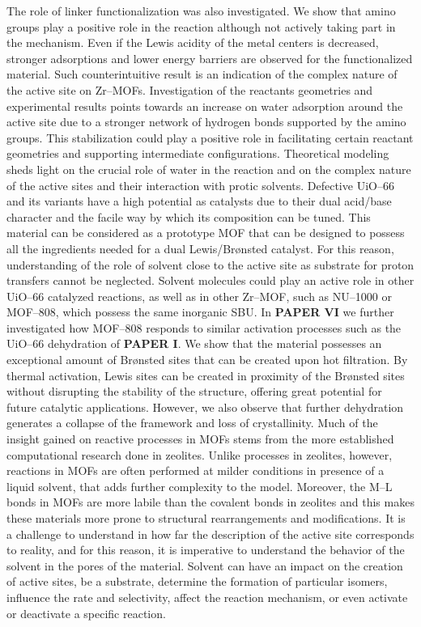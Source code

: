 \npar
The role of linker functionalization was also investigated. We show that amino groups play a positive role in the reaction although not actively taking part in the mechanism. Even if the Lewis acidity of the metal centers is decreased, stronger adsorptions and lower energy barriers are observed for the functionalized material. Such counterintuitive result is an indication of the complex nature of the active site on Zr--MOFs. Investigation of the reactants geometries and experimental results points towards an increase on water adsorption around the active site due to a stronger network of hydrogen bonds supported by the amino groups. This stabilization could play a positive role in facilitating certain reactant geometries and supporting intermediate configurations. Theoretical modeling sheds light on the crucial role of water in the reaction and on the complex nature of the active sites and their interaction with protic solvents. Defective UiO--66 and its variants have a high potential as catalysts due to their dual acid/base character and the facile way by which its composition can be tuned. This material can be considered as a prototype MOF that can be designed to possess all the ingredients needed for a dual Lewis/Br\o{}nsted catalyst. For this reason, understanding of the role of solvent close to the active site as substrate for proton transfers cannot be neglected. Solvent molecules could play an active role in other UiO--66 catalyzed reactions, as well as in other Zr--MOF, such as NU--1000 or MOF--808, which possess the same inorganic SBU. 
\npar
In \textbf{PAPER VI} we further investigated how MOF--808 responds to similar activation processes such as the UiO--66 dehydration of \textbf{PAPER I}. We show that the material possesses an exceptional amount of Br\o{}nsted sites that can be created upon hot filtration. By thermal activation, Lewis sites can be created in proximity of the Br\o{}nsted sites without disrupting the stability of the structure, offering great potential for future catalytic applications. However, we also observe that further dehydration generates a collapse of the framework and loss of crystallinity.
\npar
Much of the insight gained on reactive processes in MOFs stems from the more established computational research done in zeolites. Unlike processes in zeolites, however, reactions in MOFs are often performed at milder conditions in presence of a liquid solvent, that adds further complexity to the model. Moreover, the M--L bonds in MOFs are more labile than the covalent bonds in zeolites and this makes these materials more prone to structural rearrangements and modifications. It is a challenge to understand in how far the description of the active site corresponds to reality, and for this reason, it is imperative to understand the behavior of the solvent in the pores of the material. Solvent can have an impact on the creation of active sites, be a substrate, determine the formation of particular isomers, influence the rate and selectivity, affect the reaction mechanism, or even activate or deactivate a specific reaction.

